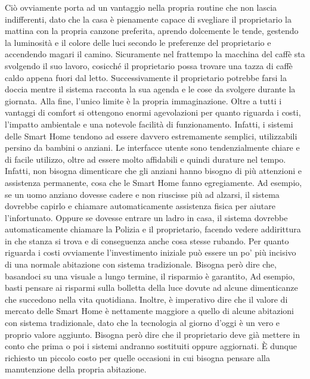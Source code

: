 Ciò ovviamente porta ad un vantaggio nella propria routine che non lascia indifferenti, dato che la casa è pienamente capace di svegliare il proprietario la mattina con la propria canzone preferita, aprendo dolcemente le tende, gestendo la luminosità e il colore delle luci secondo le preferenze del proprietario e accendendo magari il camino.
Sicuramente nel frattempo la macchina del caffè sta svolgendo il suo lavoro, cosicché il proprietario possa trovare una tazza di caffè caldo appena fuori dal letto. Successivamente il proprietario potrebbe farsi la doccia mentre il sistema racconta la sua agenda e le cose da svolgere durante la giornata.
Alla fine, l’unico limite è la propria immaginazione.
Oltre a tutti i vantaggi di comfort si ottengono enormi agevolazioni per quanto riguarda i costi, l’impatto ambientale e una notevole facilità di funzionamento. 
Infatti, i sistemi delle Smart Home tendono ad essere davvero estremamente semplici, utilizzabili persino da bambini o anziani. Le interfacce utente sono tendenzialmente chiare e di facile utilizzo, oltre ad essere molto affidabili e quindi durature nel tempo. Infatti, non bisogna dimenticare che gli anziani hanno bisogno di più attenzioni e assistenza permanente, cosa che le Smart Home fanno egregiamente. 
Ad esempio, se un uomo anziano dovesse cadere e non riuscisse più ad alzarsi, il sistema dovrebbe capirlo e chiamare automaticamente assistenza fisica per aiutare l’infortunato. Oppure se dovesse entrare un ladro in casa, il sistema dovrebbe automaticamente chiamare la Polizia e il proprietario, facendo vedere addirittura in che stanza si trova e di conseguenza anche cosa stesse rubando. 
Per quanto riguarda i costi ovviamente l’investimento iniziale può essere un po’ più incisivo di una normale abitazione con sistema tradizionale. Bisogna però dire che, basandoci su una visuale a lungo termine, il risparmio è garantito, 
Ad esempio, basti pensare ai risparmi sulla bolletta della luce dovute ad alcune dimenticanze che succedono nella vita quotidiana.
Inoltre, è imperativo dire che il valore di mercato delle Smart Home è nettamente maggiore a quello di alcune abitazioni con sistema tradizionale, dato che la tecnologia al giorno d’oggi è un vero e proprio valore aggiunto. 
Bisogna però dire che il proprietario deve già mettere in conto che prima o poi i sistemi andranno sostituiti oppure aggiornati. È dunque richiesto un piccolo costo per quelle occasioni in cui bisogna pensare alla manutenzione della propria abitazione.
